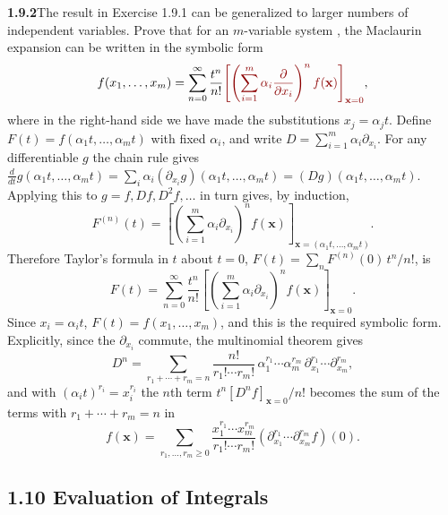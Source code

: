 \par\bigskip
\noindent\textbf{1.9.2}\quad The result in Exercise 1.9.1 can be generalized
to larger numbers of independent variables. Prove that for an $m$-variable
system , the Maclaurin expansion can be written in the symbolic form
\[
f(x_{1},\ldots,x_{m})
=\sum_{n=0}^{\infty}\frac{t^{n}}{n!}
\erratum{\left[\left(\sum_{i=1}^{m}\alpha_{i}
\frac{\partial}{\partial x_{i}}\right)^{n}f(\mathbf x)\right]_{\mathbf x=0}},
\]
where in the right-hand side we have made the substitutions $x_{j}=\alpha_{j}t$.
\solution
Define $F(t)=f(\alpha_1t,\ldots,\alpha_mt)$ with fixed $\alpha_i$, and
write $D=\sum_{i=1}^m\alpha_i\partial_{x_i}$. For any differentiable
$g$ the chain rule gives
$\frac{d}{dt}g(\alpha_1t,\ldots,\alpha_mt)
=\sum_i\alpha_i(\partial_{x_i}g)(\alpha_1t,\ldots,\alpha_mt)
=(Dg)(\alpha_1t,\ldots,\alpha_mt)$.
Applying this to $g=f,Df,D^2f,\ldots$ in turn gives, by induction,
\[
 F^{(n)}(t)=\left[\left(\sum_{i=1}^m\alpha_i\partial_{x_i}\right)^n
 f(\mathbf x)\right]_{\mathbf x=(\alpha_1t,\ldots,\alpha_mt)}.
\]
Therefore Taylor's formula in $t$ about $t=0$,
$F(t)=\sum_nF^{(n)}(0)\,t^n/n!$, is
\[
 F(t)=\sum_{n=0}^\infty\frac{t^n}{n!}
 \left[\left(\sum_{i=1}^m\alpha_i\partial_{x_i}\right)^n
 f(\mathbf x)\right]_{\mathbf x=0}.
\]
 Since $x_i=\alpha_it$, $F(t)=f(x_1,\ldots,x_m)$, and this is the
required symbolic form. Explicitly, since the $\partial_{x_i}$ commute,
the multinomial theorem gives
\[
 D^n=\sum_{r_1+\cdots+r_m=n}\frac{n!}{r_1!\cdots r_m!}\,
 \alpha_1^{r_1}\cdots\alpha_m^{r_m}\,
 \partial_{x_1}^{r_1}\cdots\partial_{x_m}^{r_m},
\]
and with $(\alpha_it)^{r_i}=x_i^{r_i}$ the $n$th term
$t^n[D^nf]_{\mathbf x=0}/n!$ becomes the sum of the terms with
$r_1+\cdots+r_m=n$ in
\[
 f(\mathbf x)=\sum_{r_1,\ldots,r_m\ge0}
 \frac{x_1^{r_1}\cdots x_m^{r_m}}{r_1!\cdots r_m!}
 (\partial_{x_1}^{r_1}\cdots\partial_{x_m}^{r_m}f)(0).
\]


\subsection*{1.10 Evaluation of Integrals}

